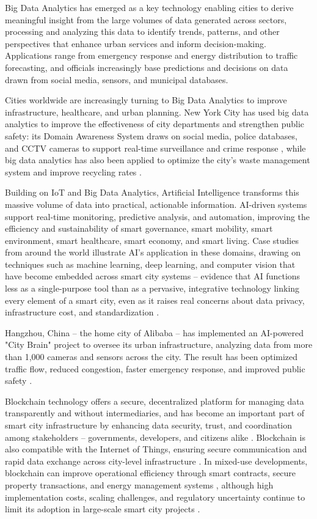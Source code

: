 \documentclass[journal]{IEEEtran}
\begin{document}
Big Data Analytics has emerged as a key technology enabling cities to derive meaningful insight from the large volumes of data generated across sectors, processing and analyzing this data to identify trends, patterns, and other perspectives that enhance urban services and inform decision-making. Applications range from emergency response and energy distribution to traffic forecasting, and officials increasingly base predictions and decisions on data drawn from social media, sensors, and municipal databases.

Cities worldwide are increasingly turning to Big Data Analytics to improve infrastructure, healthcare, and urban planning. New York City has used big data analytics to improve the effectiveness of city departments and strengthen public safety: its Domain Awareness System draws on social media, police databases, and CCTV cameras to support real-time surveillance and crime response \cite{r18}, while big data analytics has also been applied to optimize the city's waste management system and improve recycling rates \cite{r70}.

Building on IoT and Big Data Analytics, Artificial Intelligence transforms this massive volume of data into practical, actionable information. AI-driven systems support real-time monitoring, predictive analysis, and automation, improving the efficiency and sustainability of smart governance, smart mobility, smart environment, smart healthcare, smart economy, and smart living. Case studies from around the world illustrate AI's application in these domains, drawing on techniques such as machine learning, deep learning, and computer vision that have become embedded across smart city systems -- evidence that AI functions less as a single-purpose tool than as a pervasive, integrative technology linking every element of a smart city, even as it raises real concerns about data privacy, infrastructure cost, and standardization \cite{r6}.

Hangzhou, China -- the home city of Alibaba -- has implemented an AI-powered "City Brain" project to oversee its urban infrastructure, analyzing data from more than 1,000 cameras and sensors across the city. The result has been optimized traffic flow, reduced congestion, faster emergency response, and improved public safety \cite{r71}.

Blockchain technology offers a secure, decentralized platform for managing data transparently and without intermediaries, and has become an important part of smart city infrastructure by enhancing data security, trust, and coordination among stakeholders -- governments, developers, and citizens alike \cite{r92,r93}. Blockchain is also compatible with the Internet of Things, ensuring secure communication and rapid data exchange across city-level infrastructure \cite{r94}. In mixed-use developments, blockchain can improve operational efficiency through smart contracts, secure property transactions, and energy management systems \cite{r95,r97}, although high implementation costs, scaling challenges, and regulatory uncertainty continue to limit its adoption in large-scale smart city projects \cite{r97,r96}.
\end{document}
